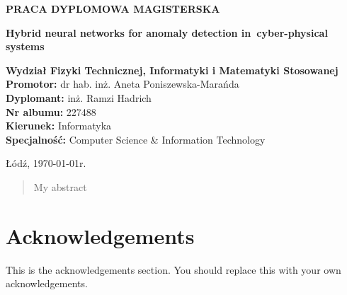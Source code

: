 \pagestyle{empty}
\begin{center}

{\large \textbf{PRACA DYPLOMOWA MAGISTERSKA}}
\vspace{6cm}

{\fontsize{18}{18}\selectfont \textbf{Hybrid neural networks for anomaly detection in~cyber-physical systems}}
\end{center}
\normalsize
\vspace{6cm}
\textbf{Wydział Fizyki Technicznej, Informatyki i Matematyki Stosowanej \\
Promotor:} dr hab. inż. Aneta Poniszewska-Marańda\\
\textbf{Dyplomant:} inż. Ramzi Hadrich\\
\textbf{Nr albumu:} 227488\\
\textbf{Kierunek:} Informatyka\\
\textbf{Specjalność:} Computer Science \& Information Technology\\
\begin{center}
    Łódź, \today r.
\end{center}


\cleardoublepage
\begin{abstract}
    My abstract
\end{abstract}


% 

\cleardoublepage

\section*{Acknowledgements}

This is the acknowledgements section.  You should replace this with your
own acknowledgements.

